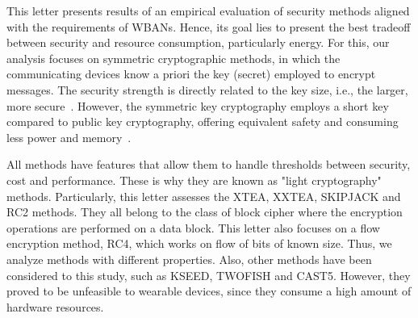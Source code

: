 
This letter presents results of an empirical evaluation of security methods aligned with the requirements of WBANs. Hence, its goal lies to present the best tradeoff between security and resource consumption, particularly energy. For this, our analysis focuses on symmetric cryptographic methods, in which the communicating devices know a priori the key (secret) employed to encrypt messages\cite{mandal2012evaluation}. The security strength is directly related to the key size, i.e., the larger, more secure~\cite{jorstad1997cryptographic,mandal2012evaluation}. However, the symmetric key cryptography employs a short key compared to public key cryptography, offering equivalent safety and consuming less power and memory~\cite{liu2010hybrid,mandal2012evaluation}.


All methods have features that allow them to handle thresholds between security, cost and performance. These is why they are known as "light cryptography" methods. Particularly, this letter assesses the XTEA, XXTEA, SKIPJACK and RC2 methods. They all belong to the class of block cipher where the encryption operations are performed on a data block. This letter also focuses on a flow encryption method, RC4, which works on flow of bits of known size. Thus, we analyze methods with different properties. Also, other methods have been considered to this study, such as KSEED, TWOFISH and CAST5. However, they proved to be unfeasible to wearable devices, since they consume a high amount of hardware resources.

